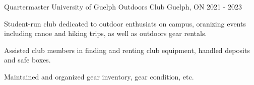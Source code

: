 \begin{cventries}
\cventry
{Quartermaster}
{University of Guelph Outdoors Club}
{Guelph, ON}
{2021 - 2023}
{
\begin{cvitems}
\item {Student-run club dedicated to outdoor enthusiats on campus, oranizing events including canoe and hiking trips, as well as outdoors gear rentals.}
\item {Assisted club members in finding and renting club equipment, handled deposits and safe boxes.}
\item {Maintained and organized gear inventory, gear condition, etc.}
\end{cvitems}
}
\end{cventries}